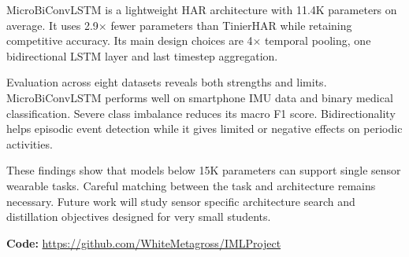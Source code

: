 \documentclass[conference,twocolumn]{IEEEtran}
\newcommand{\modelname}{MicroBiConvLSTM}
\begin{document}
\modelname{} is a lightweight HAR architecture with 11.4K parameters on average. It uses 2.9$\times$ fewer parameters than TinierHAR while retaining competitive accuracy. Its main design choices are 4$\times$ temporal pooling, one bidirectional LSTM layer and last timestep aggregation.

Evaluation across eight datasets reveals both strengths and limits. \modelname{} performs well on smartphone IMU data and binary medical classification. Severe class imbalance reduces its macro F1 score. Bidirectionality helps episodic event detection while it gives limited or negative effects on periodic activities.

These findings show that models below 15K parameters can support single sensor wearable tasks. Careful matching between the task and architecture remains necessary. Future work will study sensor specific architecture search and distillation objectives designed for very small students.

\noindent\textbf{Code:} \url{https://github.com/WhiteMetagross/IMLProject}
\end{document}
